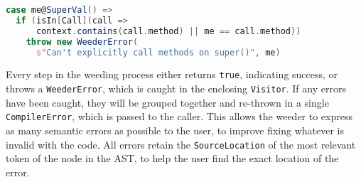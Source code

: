 \documentclass{article}
\begin{document}
\begin{lstlisting}[language=Scala]
case me@SuperVal() =>
  if (isIn[Call](call =>
      context.contains(call.method) || me == call.method))
    throw new WeederError(
      s"Can't explicitly call methods on super()", me)
\end{lstlisting}

Every step in the weeding process either returns {\tt true}, indicating success,
or throws a {\tt WeederError}, which is caught in the enclosing {\tt Visitor}. If any
errors have been caught, they will be grouped together and re-thrown in a single
{\tt CompilerError}, which is passed to the caller. This allows the weeder to express
as many semantic errors as possible to the user, to improve fixing whatever is invalid
with the code. All errors retain the {\tt SourceLocation} of the most relevant token of the
node in the AST, to help the user find the exact location of the error.
\end{document}
